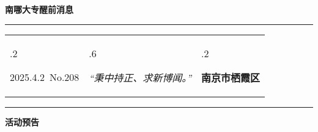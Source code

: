 \documentclass[letterpaper, 12pt]{article}
\begin{document}
\begin{center}
    \Huge\textbf{南哪大专醒前消息}
\end{center}
\vspace{4mm}
\hrule
\renewcommand\tabularxcolumn[1]{m{#1}}
\begin{tabularx}{\textwidth}{>{\hsize.2\hsize}X>{\hsize.6\hsize}X>{\hsize.2\hsize}X}
    \begin{flushleft}
        2025.4.2\, No.208
    \end{flushleft}
    &
    \begin{center}
        \textit{“秉中持正、求新博闻。”}
    \end{center}
    &
    \begin{flushright}
        \textbf{南京市栖霞区}
    \end{flushright}
\end{tabularx}
\vspace{-3.5mm}
\hrule
\vspace{4mm}
\centerline{\huge\textbf{活动预告}}
\end{document}
